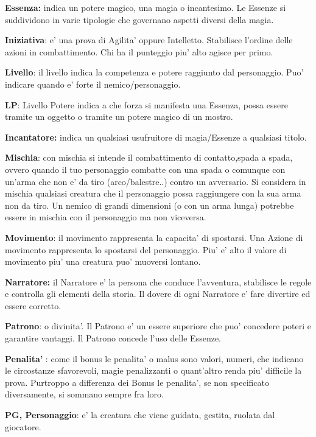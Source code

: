 \documentclass[a4paper,11pt,twoside,openany]{book}
\begin{document}
\textbf{Essenza:} indica un potere magico, una magia o incantesimo. Le Essenze si suddividono in varie tipologie che governano aspetti diversi della magia.

\textbf{Iniziativa}: e' una prova di Agilita' oppure Intelletto. Stabilisce l'ordine delle azioni in combattimento. Chi ha il punteggio piu' alto agisce per primo.

\textbf{Livello}: il livello indica la competenza e potere raggiunto dal personaggio. Puo' indicare quando e' forte il nemico/personaggio. 

\textbf{LP}: Livello Potere indica a che forza si manifesta una Essenza, possa essere tramite un oggetto o tramite un potere magico di un mostro.

\textbf{Incantatore:} indica un qualsiasi usufruitore di magia/Essenze a qualsiasi titolo.

\textbf{Mischia}: con mischia si intende il combattimento di contatto,spada a spada, ovvero quando il tuo personaggio combatte con una spada o comunque con un'arma che non e' da tiro (arco/balestre..) contro un avversario.
Si considera in mischia qualsiasi creatura che il personaggio possa raggiungere con la sua arma non da tiro. Un nemico di grandi dimensioni (o con un arma lunga) potrebbe essere in mischia con il personaggio ma non viceversa.

\textbf{Movimento}: il movimento rappresenta la capacita' di spostarsi. Una Azione di movimento rappresenta lo spostarsi del personaggio. Piu' e' alto il valore di movimento piu' una creatura puo' muoversi lontano.

\textbf{Narratore:} il Narratore e' la persona che conduce l'avventura, stabilisce le regole e controlla gli elementi della storia. Il dovere di ogni Narratore e' fare divertire ed essere corretto.

\textbf{Patrono}: o divinita'. Il Patrono e' un essere superiore che puo' concedere poteri e garantire vantaggi. Il Patrono concede l'uso delle Essenze.

\textbf{Penalita'} : come il bonus le penalita' o malus sono valori, numeri, che indicano le circostanze sfavorevoli, magie penalizzanti o quant'altro renda piu' difficile la prova. Purtroppo a differenza dei Bonus le penalita', se non specificato diversamente, si sommano sempre fra loro. 

\textbf{PG, Personaggio}: e' la creatura che viene guidata, gestita, ruolata dal giocatore.
\end{document}
